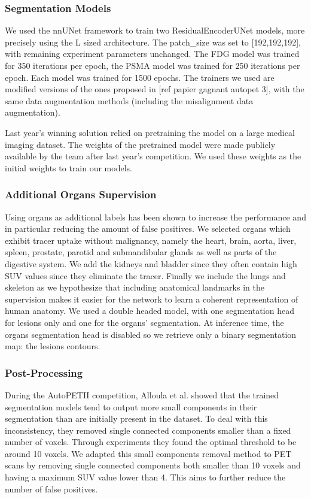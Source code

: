 \documentclass[runningheads]{llncs}
\begin{document}
\subsubsection{Segmentation Models}
We used the nnUNet framework to train two ResidualEncoderUNet models, more precisely using the L sized architecture.
The patch_size was set to [192,192,192], with remaining experiment parameters unchanged.
The FDG model was trained for 350 iterations per epoch, the PSMA model was trained for 250 iterations per epoch.
Each model was trained for 1500 epochs. 
The trainers we used are modified versions of the ones proposed in [ref papier gagnant autopet 3], with the same data augmentation methods (including the misalignment data augmentation).

Last year's winning solution relied on pretraining the model on a large medical imaging dataset. The weights of the pretrained model were made publicly available by the team after last year’s competition.
We used these weights as the initial weights to train our models.

\subsubsection{Additional Organs Supervision}
Using organs as additional labels has been shown to increase the performance and in particular reducing the amount of false positives.
We selected organs which exhibit tracer uptake without malignancy, namely the heart, brain, aorta, liver, spleen, prostate, parotid and submandibular glands as well as parts of the digestive system.
We add the kidneys and bladder since they often contain high SUV values since they eliminate the tracer.
Finally we include the lungs and skeleton as we hypothesize that including anatomical landmarks in the supervision makes it easier for the network to learn a coherent representation of human anatomy.
We used a double headed model, with one segmentation head for lesions only and one for the organs' segmentation.
At inference time, the organs segmentation head is disabled so we retrieve only a binary segmentation map: the lesions contours.

\subsubsection{Post-Processing}
During the AutoPETII competition, Alloula et al.\cite{alloula2024autopetchallenge2023nnunetbased} showed that the trained segmentation models tend to output more small components in their segmentation than are initially present in the dataset.
To deal with this inconsistency, they removed single connected components smaller than a fixed number of voxels.
Through experiments they found the optimal threshold to be around 10 voxels.
We adapted this small components removal method to PET scans by removing single connected components both smaller than 10 voxels and having a maximum SUV value lower than 4.
This aims to further reduce the number of false positives.
\end{document}
